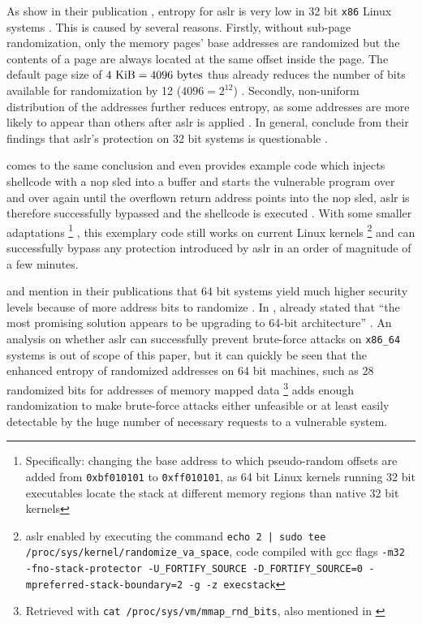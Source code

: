 As \citeauthor{MarcoGisbert2016} show in their publication , entropy for \gls{aslr} is very low in 32 bit \texttt{x86} Linux systems \cite[4\psqq]{MarcoGisbert2016}.
This is caused by several reasons.
Firstly, without sub-page randomization, only the memory pages' base addresses are randomized but the contents of a page are always located at the same offset inside the page.
The default page size of $ 4 \text{\space KiB} = 4096 \text{\space bytes} $ thus already reduces the number of bits available for randomization by 12 ($ 4096 = 2^{12} $) \cite[8\psqq]{MarcoGisbert2016}.
Secondly, non-uniform distribution of the addresses further reduces entropy, as some addresses are more likely to appear than others after \gls{aslr} is applied \cite[4\psqq]{MarcoGisbert2016}.
In general, \citeauthor{MarcoGisbert2016} conclude from their findings that \gls{aslr}'s protection on 32 bit systems is questionable \cite[15]{MarcoGisbert2016}.

 comes to the same conclusion and even provides example code which injects shellcode with a \acs{nop} sled into a buffer and starts the vulnerable program over and over again until the overflown return address points into the \acs{nop} sled, \gls{aslr} is therefore successfully bypassed and the shellcode is executed \cite[3\psq]{Mueller2008}.
With some smaller adaptations%
	\footnote{Specifically: changing the base address to which pseudo-random offsets are added from \texttt{0xbf010101} to \texttt{0xff010101}, as 64 bit Linux kernels running 32 bit executables locate the stack at different memory regions than native 32 bit kernels}%
, this exemplary code still works on current Linux kernels%
	\footnote{\gls{aslr} enabled by executing the command \texttt{echo 2 | sudo tee /proc/sys/kernel/randomize\_\linebreak[0]va\_space}, code compiled with \gls{gcc} flags \texttt{-m32 -fno-stack-protector -U\_FORTIFY\_SOURCE -D\_FORTIFY\_SOURCE=0 -mpreferred-stack-boundary=2 -g -z execstack}}
and can successfully bypass any protection introduced by \gls{aslr} in an order of magnitude of a few minutes.

 and \citeauthor{Mueller2008} mention in their publications that 64 bit systems yield much higher security levels because of more address bits to randomize \cites[15]{MarcoGisbert2016}[3]{Mueller2008}.
In \citeyear{Shacham2004}, \citeauthor{Shacham2004} already stated that ``the most promising solution appears to be upgrading to 64-bit architecture'' \cite[306]{Shacham2004}.
An analysis on whether \gls{aslr} can successfully prevent brute-force attacks on \texttt{x86\_64} systems is out of scope of this paper, but it can quickly be seen that the enhanced entropy of randomized addresses on 64 bit machines, such as 28 randomized bits for addresses of memory mapped data%
	\footnote{Retrieved with \texttt{cat /proc/sys/vm/mmap\_rnd\_bits}, also mentioned in \cite[4\psq]{MarcoGisbert2016}}
adds enough randomization to make brute-force attacks either unfeasible or at least easily detectable by the huge number of necessary requests to a vulnerable system.

